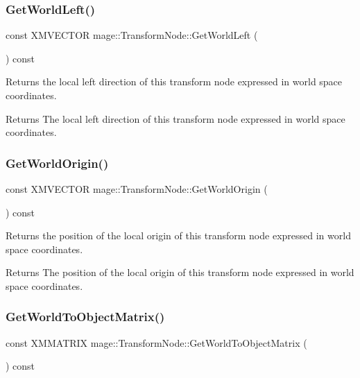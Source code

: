\subsubsection{\texorpdfstring{Get\+World\+Left()}{GetWorldLeft()}}
{\footnotesize\ttfamily const X\+M\+V\+E\+C\+T\+OR mage\+::\+Transform\+Node\+::\+Get\+World\+Left (\begin{DoxyParamCaption}{ }\end{DoxyParamCaption}) const}

Returns the local left direction of this transform node expressed in world space coordinates.

\begin{DoxyReturn}{Returns}
The local left direction of this transform node expressed in world space coordinates. 
\end{DoxyReturn}
\hypertarget{classmage_1_1_transform_node_aba58cc38ebed3fef3bd537fbb09e329a}{}\label{classmage_1_1_transform_node_aba58cc38ebed3fef3bd537fbb09e329a} 
\subsubsection{\texorpdfstring{Get\+World\+Origin()}{GetWorldOrigin()}}
{\footnotesize\ttfamily const X\+M\+V\+E\+C\+T\+OR mage\+::\+Transform\+Node\+::\+Get\+World\+Origin (\begin{DoxyParamCaption}{ }\end{DoxyParamCaption}) const}

Returns the position of the local origin of this transform node expressed in world space coordinates.

\begin{DoxyReturn}{Returns}
The position of the local origin of this transform node expressed in world space coordinates. 
\end{DoxyReturn}
\hypertarget{classmage_1_1_transform_node_a20bb6f313308bee29893be0685c884f9}{}\label{classmage_1_1_transform_node_a20bb6f313308bee29893be0685c884f9} 
\subsubsection{\texorpdfstring{Get\+World\+To\+Object\+Matrix()}{GetWorldToObjectMatrix()}}
{\footnotesize\ttfamily const X\+M\+M\+A\+T\+R\+IX mage\+::\+Transform\+Node\+::\+Get\+World\+To\+Object\+Matrix (\begin{DoxyParamCaption}{ }\end{DoxyParamCaption}) const}

